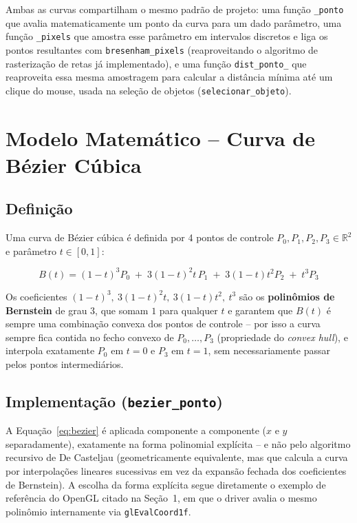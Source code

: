 \documentclass[11pt,a4paper]{article}
\begin{document}
Ambas as curvas compartilham o mesmo padrão de projeto: uma função
\texttt{\_ponto} que avalia matematicamente um ponto da curva para um dado
parâmetro, uma função \texttt{\_pixels} que amostra esse parâmetro em
intervalos discretos e liga os pontos resultantes com \texttt{bresenham\_pixels}
(reaproveitando o algoritmo de rasterização de retas já implementado), e uma
função \texttt{dist\_ponto\_} que reaproveita essa mesma amostragem para
calcular a distância mínima até um clique do mouse, usada na seleção de
objetos (\texttt{selecionar\_objeto}).

\section{Modelo Matemático -- Curva de Bézier Cúbica}

\subsection{Definição}

Uma curva de Bézier cúbica é definida por 4 pontos de controle
$P_0, P_1, P_2, P_3 \in \mathbb{R}^2$ e parâmetro $t \in [0,1]$:

\begin{equation}
B(t) = (1-t)^3 P_0 \;+\; 3(1-t)^2 t\, P_1 \;+\; 3(1-t) t^2 P_2 \;+\; t^3 P_3
\label{eq:bezier}
\end{equation}

Os coeficientes $(1-t)^3,\ 3(1-t)^2t,\ 3(1-t)t^2,\ t^3$ são os \textbf{polinômios
de Bernstein} de grau 3, que somam $1$ para qualquer $t$ e garantem que $B(t)$
é sempre uma combinação convexa dos pontos de controle -- por isso a curva
sempre fica contida no fecho convexo de $P_0,\dots,P_3$ (propriedade do
\emph{convex hull}), e interpola exatamente $P_0$ em $t=0$ e $P_3$ em $t=1$,
sem necessariamente passar pelos pontos intermediários.

\subsection{Implementação (\texttt{bezier\_ponto})}

A Equação~\ref{eq:bezier} é aplicada componente a componente ($x$ e $y$
separadamente), exatamente na forma polinomial explícita -- e não pelo
algoritmo recursivo de De Casteljau (geometricamente equivalente, mas que
calcula a curva por interpolações lineares sucessivas em vez da expansão
fechada dos coeficientes de Bernstein). A escolha da forma explícita segue
diretamente o exemplo de referência do OpenGL citado na Seção~1, em que o
driver avalia o mesmo polinômio internamente via \texttt{glEvalCoord1f}.
\end{document}
